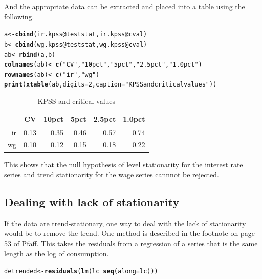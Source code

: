 \documentclass{article}\usepackage{graphicx, color}
\makeatletter
\newcommand{\hlfunctioncall}[1]{\textcolor[rgb]{0.501960784313725,0,0.329411764705882}{\textbf{#1}}}%
\newcommand{\hlstring}[1]{\textcolor[rgb]{0.6,0.6,1}{#1}}%
\newenvironment{kframe}{%
 \def\at@end@of@kframe{}%
 \ifinner\ifhmode%
  \def\at@end@of@kframe{\end{minipage}}%
  \begin{minipage}{\columnwidth}%
 \fi\fi%
 \def\FrameCommand##1{\hskip\@totalleftmargin \hskip-\fboxsep
 \colorbox{shadecolor}{##1}\hskip-\fboxsep
     \hskip-\linewidth \hskip-\@totalleftmargin \hskip\columnwidth}%
 \MakeFramed {\advance\hsize-\width
   \@totalleftmargin\z@ \linewidth\hsize
   \@setminipage}}%
 {\par\unskip\endMakeFramed%
 \at@end@of@kframe}
\newenvironment{knitrout}{}{} %
\makeatother
\begin{document}
And the appropriate data can be extracted and placed into a table using the following. 
\begin{kframe}
\begin{alltt}
a <- \hlfunctioncall{cbind}(ir.kpss@teststat, ir.kpss@cval)
b <- \hlfunctioncall{cbind}(wg.kpss@teststat, wg.kpss@cval)
ab <- \hlfunctioncall{rbind}(a, b)
\hlfunctioncall{colnames}(ab) <- \hlfunctioncall{c}(\hlstring{"CV"}, \hlstring{"10pct"}, \hlstring{"5pct"}, \hlstring{"2.5pct"}, \hlstring{"1.0pct"})
\hlfunctioncall{rownames}(ab) <- \hlfunctioncall{c}(\hlstring{"ir"}, \hlstring{"wg"})
\hlfunctioncall{print}(\hlfunctioncall{xtable}(ab, digits = 2, caption = \hlstring{"KPSS and critical values"}))
\end{alltt}
\end{kframe}%
\begin{table}[ht]
\begin{center}
\begin{tabular}{rrrrrr}
  \hline
 & CV & 10pct & 5pct & 2.5pct & 1.0pct \\ 
  \hline
ir & 0.13 & 0.35 & 0.46 & 0.57 & 0.74 \\ 
  wg & 0.10 & 0.12 & 0.15 & 0.18 & 0.22 \\ 
   \hline
\end{tabular}
\caption{KPSS and critical values}
\end{center}
\end{table}


This shows that the null hypothesis of level stationarity for the interest rate series and trend stationarity for the wage series cannnot be rejected.  

\subsection{Dealing with lack of stationarity}
If the data are trend-stationary, one way to deal with the lack of stationarity would be to remove the trend.  One method is described in the footnote on page 53 of Pfaff. This takes the residuals from a regression of a series that is the same length as the log of consumption.   
\begin{knitrout}
\color{fgcolor}\begin{kframe}
\begin{alltt}
detrended <- \hlfunctioncall{residuals}(\hlfunctioncall{lm}(lc ~ \hlfunctioncall{seq}(along = lc)))
\end{alltt}
\end{kframe}
\end{knitrout}
\end{document}
